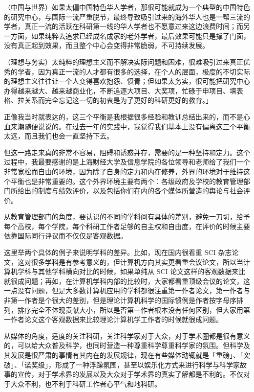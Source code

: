 （中国与世界）如果太偏中国特色华人学者，那很可能就成为一个典型的中国特色的研究中心，与国际一流严重脱节，最终导致吸引过来的海外华人也是一帮三流的学者，真正一流的活跃在科研第一线的华人学者也不愿意过来这边浪费时间；而另一方面，如果纯粹去追求已经成名成家的老外学者，最后效果可能只是撑了门面，没有真正起到效果，而且整个中心会变得非常脆弱，不可持续发展。

（理想与务实）太纯粹的理想主义而不解决实际问题和困难，很难吸引过来真正优秀的学者，因为真正一流的人才都有很多的选择，在个人的层面，极度的不切实际的理想主义往往让一个人变得喜欢抱怨、愤青；但如果太务实，很可能把研究中心办得越来越大、越来越商业化，不断追逐大项目、大奖项，忙碌于申项目、填表格、拉关系而完全忘记这一切的初衷是为了更好的科研更好的教育。」

正像我当时就表达的，这三个平衡是我根据很多经验和教训总结出来的，而不是心血来潮随便说说的。在过去一年的实践中，我觉得我们基本上没有偏离这三个平衡太远，而且我们也会一直坚持下去。

但这一路走来真的非常不容易，阻碍和诱惑并存，需要的是一种坚持和定力。这个过程中，我最要感谢的是上海财经大学及信息学院的各位领导和老师给了我们一个非常宽松而自由的环境，因为除了自身的定力和内在修养，外界的环境对于维持这个平衡也是非常重要的。这个外界环境主要有两个：各级政府及学校的教育管理部门所给出的制度与绩效评价，以及包括你们在内的各个媒体所营造的舆论与社会评价。

从教育管理部门的角度，要认识的不同的学科间有具体的差别，避免一刀切，给予每个高校，每个学院，每个科研工作者足够的自主权和自由度，在评价的时候主要依靠国际同行评议而不仅仅是客观数据。

这里举两个具体的例子来说明学科的差异。比如，现在国内很看重 SCI 杂志论文，这对很多学科是有参考意义的，但计算机方向其实更看重会议论文，所以当计算机学科与其他学科横向对比的时候，如果单纯从 SCI 论文这样的客观数据来比就很成问题；再如，在计算机学科内部的比较时，大家都看重顶级会议的论文，这一点没有问题，但是大多数计算机应用的学科都很注重第一作者论文，第一作者与非第一作者是个很大的差别，但是理论计算机科学的国际惯例是作者按字母序排列，排序完全不体现贡献大小，所以是否第一作者根本没有任何区别，但大家用第一作者论文这个客观数据来比较理论计算机学工作者的时候就很成问题。

从媒体的角度，适度的关注科研，关注科学家对于大众，对于学术圈都是很有意义的，可以给大众普及科学，也同时营造一种尊重科学尊重科学家的氛围。但科学及其发展是很严肃的事情有其内在的发展规律，现在有些媒体动辄就是「重磅」、「突破」、「诺奖级」，形成了一种浮躁氛围，甚至以娱乐化方式来进行科学与科学家故事的宣传，对于学术界的发展以及大众对于学术界的真实了解都是不利的。不仅对于大众不利，也不利于科研工作者心平气和地科研。

